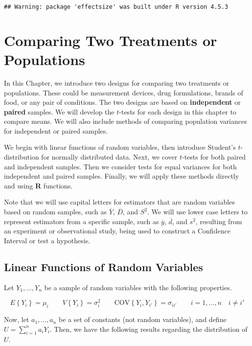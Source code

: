 \documentclass[
]{book}
\begin{document}
\begin{verbatim}
## Warning: package 'effectsize' was built under R version 4.5.3
\end{verbatim}

\chapter{Comparing Two Treatments or
Populations}\label{comparing-two-treatments-or-populations}

In this Chapter, we introduce two designs for comparing two treatments
or populations. These could be measurement devices, drug formulations,
brands of food, or any pair of conditions. The two designs are based on
\textbf{independent} or \textbf{paired} samples. We will develop the
\(t\)-tests for each design in this chapter to compare means. We will
also include methods of comparing population variances for independent
or paired samples.

We begin with linear functions of random variables, then introduce
Student's \(t\)-distribution for normally distributed data. Next, we
cover \(t\)-tests for both paired and independent samples. Then we
consider tests for equal variances for both independent and paired
samples. Finally, we will apply these methods directly and using
\textbf{R} functions.

Note that we will use capital letters for estimators that are random
variables based on random samples, such as \(\overline{Y}\),
\(\overline{D}\), and \(S^2\). We will use lower case letters to
represent estimators from a specific sample, such as \(\overline{y}\),
\(\overline{d}\), and \(s^2\), resulting from an experiment or
observational study, being used to construct a Confidence Interval or
test a hypothesis.

\section{Linear Functions of Random
Variables}\label{linear-functions-of-random-variables}

Let \(Y_1,\ldots,Y_n\) be a sample of random variables with the
following properties.

\[
E\left\{Y_i\right\} = \mu_i  \qquad V\left\{Y_i\right\} = \sigma_i^2  \qquad
\mbox{COV}\left\{Y_i,Y_{i'}\right\}=\sigma_{ii'} \qquad  i=1,\ldots,n \quad i\neq i'
\]

Now, let \(a_1,\ldots,a_n\) be a set of constants (not random
variables), and define \(U=\sum_{i=1}^na_iY_i\). Then, we have the
following results regarding the distribution of \(U\).
\end{document}
